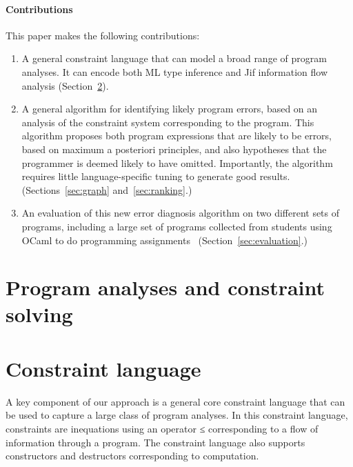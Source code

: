 \paragraph{Contributions}

This paper makes the following contributions:

\begin{enumerate}
\item
A general constraint language that can model a broad
range of program analyses. It can encode both ML type
inference and Jif information flow analysis
(Section~\ref{sec:language}).

\item
A general algorithm for identifying likely program errors,
based on an analysis of the constraint system corresponding
to the program. This algorithm proposes both program expressions
that are likely to be errors, based on maximum a posteriori
principles, and also hypotheses that the programmer is
deemed likely to have omitted. Importantly, the algorithm
requires little language-specific tuning to generate good results.
(Sections~\ref{sec:graph} and~\ref{sec:ranking}.)

\item
An evaluation of this new error diagnosis algorithm on two
different sets of programs, including a large set of programs
collected from students using OCaml to do
programming assignments~\cite{lerner:pldi07}
(Section~\ref{sec:evaluation}.)

\end{enumerate}

\section{Program analyses and constraint solving}


\section{Constraint language}
\label{sec:language}

A key component of our approach is a general core constraint language
that can be used to capture a large class of program analyses.
In this constraint language, constraints are inequations using an
operator ≤ corresponding
to a flow of information through a program. The constraint language
also supports constructors and destructors corresponding to
computation.

